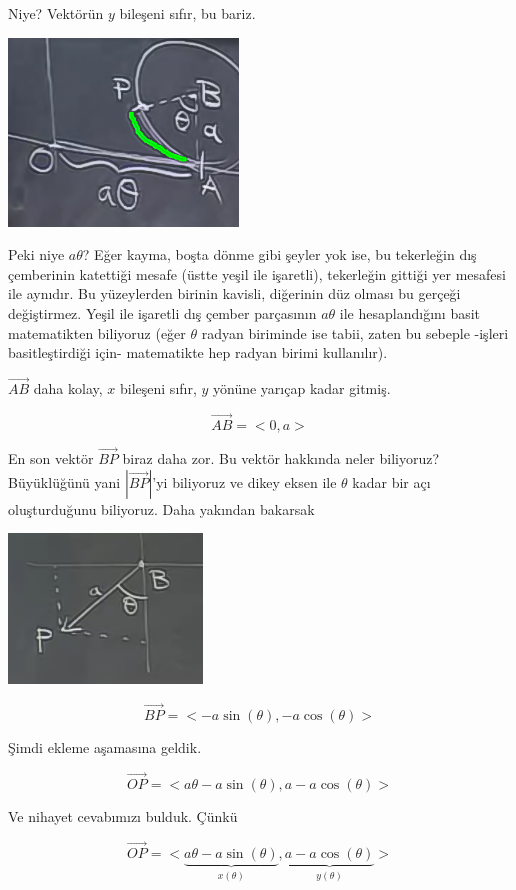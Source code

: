 \documentclass[12pt,fleqn]{article}\usepackage{../../common}
\begin{document}
Niye? Vektörün $y$ bileşeni sıfır, bu bariz. 

\includegraphics[height=5cm]{5_5.png}

Peki niye $a\theta$? Eğer kayma, boşta dönme gibi şeyler yok ise, bu tekerleğin
dış çemberinin katettiği mesafe (üstte yeşil ile işaretli), tekerleğin gittiği
yer mesafesi ile aynıdır. Bu yüzeylerden birinin kavisli, diğerinin düz olması
bu gerçeği değiştirmez. Yeşil ile işaretli dış çember parçasının $a\theta$ ile
hesaplandığını basit matematikten biliyoruz (eğer $\theta$ radyan biriminde ise
tabii, zaten bu sebeple -işleri basitleştirdiği için- matematikte hep radyan
birimi kullanılır).

$\vec{AB}$ daha kolay, $x$ bileşeni sıfır, $y$ yönüne yarıçap kadar
gitmiş. 

$$ \vec{AB} = <0, a> $$

En son vektör $\vec{BP}$ biraz daha zor. Bu vektör hakkında neler biliyoruz?
Büyüklüğünü yani $|\vec{BP}|$'yi biliyoruz ve dikey eksen ile $\theta$ kadar bir
açı oluşturduğunu biliyoruz. Daha yakından bakarsak

\includegraphics[height=4cm]{5_6.png}

$$ \vec{BP} = <-a\sin(\theta), -a\cos(\theta)> $$

Şimdi ekleme aşamasına geldik. 

$$ \vec{OP} = < a\theta - a\sin(\theta), a-a\cos(\theta) > $$

Ve nihayet cevabımızı bulduk. Çünkü 

$$ \vec{OP} = 
< \underbrace{a\theta - a\sin(\theta)}_{x(\theta)}, 
\underbrace{a-a\cos(\theta)}_{y(\theta)} > $$
\end{document}
